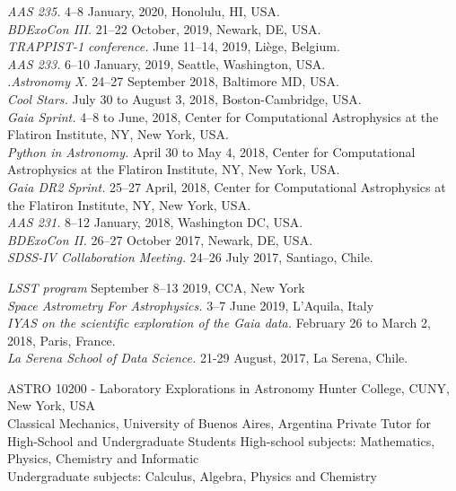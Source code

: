 \documentclass[10pt]{cv}
\begin{document}
\begin{llist}
\textit{AAS 235.} 4--8 January, 2020, Honolulu, HI, USA.\\
\textit{BDExoCon III.} 21--22 October, 2019, Newark, DE, USA.\\
\textit{TRAPPIST-1 conference.} June 11--14, 2019, Li\`ege, Belgium.\\
\textit{AAS 233.} 6--10 January, 2019, Seattle, Washington, USA.\\
\textit{.Astronomy X.} 24--27 September 2018, Baltimore MD, USA.\\
\textit{Cool Stars.} July 30 to August 3, 2018, Boston-Cambridge, USA.\\
\textit{Gaia Sprint.} 4--8 to June, 2018, Center for Computational Astrophysics at the Flatiron Institute, NY, New York, USA.\\
\textit{Python in Astronomy.}  April 30 to May 4, 2018, Center for Computational Astrophysics at the Flatiron Institute, NY, New York, USA. \\
\textit{Gaia DR2 Sprint.} 25--27 April, 2018, Center for Computational Astrophysics at the Flatiron Institute, NY, New York, USA. \\
\textit{AAS 231.} 8--12 January, 2018, Washington DC, USA.\\
\textit{BDExoCon II.} 26--27 October 2017, Newark, DE, USA.\\
\textit{SDSS-IV Collaboration Meeting.} 24--26 July 2017, Santiago, Chile.

\textit{LSST program} September 8--13 2019, CCA, New York\\
\textit{Space Astrometry For Astrophysics.} 3--7 June 2019, L'Aquila, Italy\\
\textit{IYAS on the scientific exploration of the Gaia data.} February 26 to March 2, 2018, Paris, France.\\
\textit{La Serena School of Data Science.} 21-29 August, 2017, La Serena, Chile.



ASTRO 10200 - Laboratory Explorations in Astronomy
Hunter College, CUNY, New York, USA\\
Classical Mechanics, University of Buenos Aires, Argentina
Private Tutor for High-School and Undergraduate Students
High-school subjects: Mathematics, Physics, Chemistry and Informatic\\
Undergraduate subjects: Calculus, Algebra, Physics and Chemistry 


\end{llist}
\end{document}
